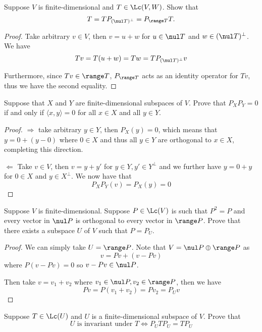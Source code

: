 \documentclass{extarticle}
\begin{document}
\begin{problem}{6}
    Suppose \(V\) is finite-dimensional and \(T \in \Lc(V, W)\). Show that
    \[T = TP_{(\nul T)^\perp} = P_{\range T}T.\]
\end{problem}

\begin{proof}
Take arbitrary \(v \in V\), then \(v = u + w\) for \(u \in \nul T\) and \(w \in (\nul T)^\perp\). We have
\[Tv = T(u + w) = Tw = T P_{(\nul T)^\perp}v\]

Furthermore, since \(Tv \in \range T\), \(P_{\range T}\) acts as an identity operator for \(Tv\), thus
we have the second equality.
\end{proof}

\begin{problem}{7}
    Suppose that \(X\) and \(Y\) are finite-dimensional subspaces of \(V\). Prove that
    \(P_XP_Y = 0\) if and only if \(\langle x,y \rangle = 0\) for all \(x \in X\) and all \(y \in Y\).
\end{problem}

\begin{proof}
\(\Rightarrow\) take arbitrary \(y \in Y\), then \(P_X (y) = 0\), which means that \(y = 0 + (y - 0)\) where
\(0 \in X\) and thus all \(y \in Y\) are orthogonal to \(x \in X\), completing this direction.

\(\Leftarrow\) Take \(v \in V\), then \(v = y + y'\) for \(y \in Y, y' \in Y^\perp\) and we further have
\(y = 0 + y\) for \(0 \in X\) and \(y \in X^\perp\). We now have that
\[P_XP_Y(v) = P_X(y)  = 0\]
\end{proof}

\begin{problem}{9}
    Suppose \(V\) is finite-dimensional. Suppose \(P \in \Lc(V)\) is such that \(P^2 = P\) and
    every vector in \(\nul P\) is orthogonal to every vector in \(\range P\). Prove that there
    exists a subspace \(U\) of \(V\) such that \(P = P_{U}\).
\end{problem}

\begin{proof}
We can simply take \(U = \range P\). Note that \(V = \nul P \oplus \range P\) as
\[v = Pv + (v - Pv)\]
where \(P(v - Pv) = 0\) so \(v - Pv \in \nul P\).

Then take \(v = v_1 + v_2\) where \(v_1 \in \nul P, v_2 \in \range P\), then we have
\[Pv = P(v_1 + v_2) = Pv_2 = P_U v \]
\end{proof}

\begin{problem}{11}
    Suppose \(T \in \Lc(U)\) and \(U\) is a finite-dimensional subspace of \(V\). Prove that
    \[U \text{ is invariant under } T \Longleftrightarrow P_U T P_U = T P_U\]
\end{problem}
\end{document}
